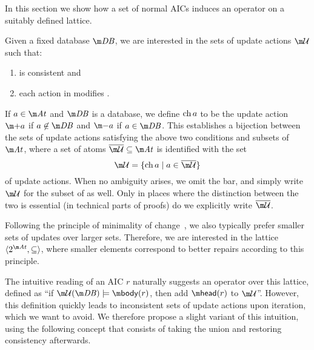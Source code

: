 In this section we show how a set of normal AICs induces an operator on a suitably defined lattice.


Given a fixed database $\db$, we are interested in the sets of update actions $\UU$ such that:
\begin{enumerate}
\item \UU is consistent and 
\item each action in \UU modifies \db.
\end{enumerate}
If $a\in \atoms$ and $\db$ is a database, we define $\operatorname{ch} a$ to be the update action $\add a$ if $a\not\in \db$ and $\remove a$ if $a \in \db$.
This establishes a bijection between the sets of update actions satisfying the above two conditions and subsets of $\atoms$, where a set of atoms $\overline\UU\subseteq\atoms$ is identified with the set 
\[\UU = \{\change a\mid a \in \overline \UU \}\]
of update actions.
When no ambiguity arises, we omit the bar, and simply write $\UU$ for the subset of \atoms as well.
Only in places where the distinction between the two is essential (in technical parts of proofs) do we explicitly write $\overline\UU$.

Following the principle of minimality of change~\cite{Winslett90,ai/EiterG92}, we also typically prefer smaller sets of updates over larger sets.
Therefore, we are interested in the lattice $\langle 2^{\atoms},\subseteq\rangle$, where smaller elements correspond to better repairs according to this principle.

The intuitive reading of an AIC $r$ naturally suggests an operator over this lattice, defined as ``if $\UU(\db)\models\body(r)$, then add $\head(r)$ to $\UU$''.
However, this definition quickly leads to inconsistent sets of update actions upon iteration, which we want to avoid.
We therefore propose a slight variant of this intuition, using the following concept that consists of taking the union and restoring consistency afterwards.


